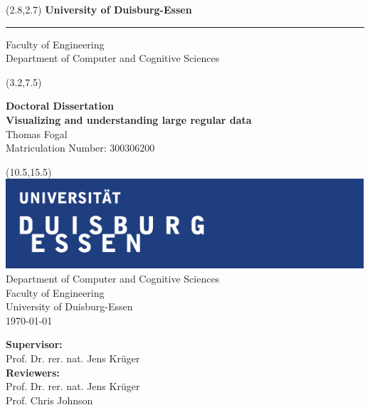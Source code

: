 \begin{titlepage}
\vspace*{-1cm}
\newlength{\links}
\setlength{\links}{0.9cm}
\setlength{\TPHorizModule}{1cm}
\setlength{\TPVertModule}{1cm}

\sf
\LARGE

\begin{textblock}{16.5}(2.8,2.7)
 \hspace*{-0.8cm} \textbf{University of Duisburg-Essen} \\
 \hspace*{-1.15cm} \rule{5mm}{5mm} \hspace*{0.0cm} Faculty of Engineering\\
 \large{}Department of Computer and Cognitive Sciences\\
\end{textblock}

\begin{textblock}{14.5}(3.2,7.5)
\begin{center}
  \large
{\bf Doctoral Dissertation} \\[1cm]
{ \LARGE  \bf Visualizing and understanding large regular data} \\[1.3cm]
Thomas Fogal\\
Matriculation Number: 300306200
\end{center}
\end{textblock}

\begin{textblock}{10}(10.5,15.5)
\includegraphics[width=.94\textwidth]{images/unilogo}\\
\normalsize
\raggedleft
Department of Computer and Cognitive Sciences \\
Faculty of Engineering \\
University of Duisburg-Essen \\[2ex]

\today\\[13ex]
\raggedright
{\bf Supervisor:} \\
Prof. Dr. rer. nat. Jens Kr\"uger\\

{\bf Reviewers:}\\
Prof. Dr. rer. nat. Jens Kr\"uger\\
Prof. Chris Johnson\\
\\
\end{textblock}

\end{titlepage}

